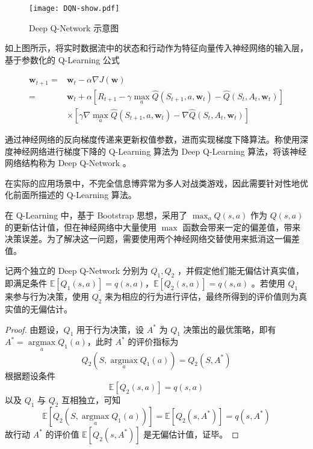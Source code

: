 \begin{figure}[H]
    \centering
    \texttt{[image: DQN-show.pdf]}
    \caption{Deep Q-Network 示意图}
\end{figure}

如上图所示，将实时数据流中的状态和行动作为特征向量传入神经网络的输入层，基于参数化的 Q-Learning 公式

\begin{equation}
\begin{aligned} \boldsymbol{w}_{t+1} =&\boldsymbol{w}_{t}-\alpha\nabla J(\boldsymbol{w}) \\ =&\boldsymbol{w}_{t}+\alpha\left[R_{t+1} - \gamma \max _{a} \widehat{Q}\left(S_{t+1}, a, \boldsymbol{w}_{t}\right)-\widehat{Q}\left(S_{t}, A_{t}, \boldsymbol{w}_{t}\right)\right]\\&\times\left[\gamma\nabla \max _{a} \widehat{Q}\left(S_{t+1}, a, \boldsymbol{w}_{t}\right)-\nabla \widehat{Q}\left(S_{t}, A_{t}, \boldsymbol{w}_{t}\right)\right] \end{aligned}
\end{equation}

通过神经网络的反向梯度传递来更新权值参数，进而实现梯度下降算法\cite{hecht1992theory}。称使用深度神经网络进行梯度下降的 Q-Learning 算法为 Deep Q-Learning 算法，将该神经网络结构称为 Deep Q-Network 。

在实际的应用场景中，不完全信息博弈常为多人对战类游戏，因此需要针对性地优化前面所描述的 Q-Learning 算法。

在 Q-Learning 中，基于 Bootstrap 思想，采用了 $\max_aQ(s,a)$ 作为 $Q(s,a)$ 的更新估计值，但在神经网络中大量使用 $\max$ 函数会带来一定的偏差值，带来决策误差。为了解决这一问题，需要使用两个神经网络交替使用来抵消这一偏差值。

\begin{Theorem}\label{the:doubledqn}
    记两个独立的 Deep Q-Network 分别为 $Q_1,Q_2$ ，并假定他们能无偏估计真实值，即满足条件 $\mathbb{E}\left[Q_1(s,a)\right] = q(s,a)$，$\mathbb{E}\left[Q_2(s,a)\right] = q(s,a)$ 。若使用 $Q_1$ 来参与行为决策，使用 $Q_2$ 来为相应的行为进行评估，最终所得到的评价值则为真实值的无偏估计。
\end{Theorem}

\begin{proof}
    由题设，$Q_1$ 用于行为决策，设 $A^*$ 为 $Q_1$ 决策出的最优策略，即有 $A^*=\mathop{\arg\max}\limits_aQ_1(a)$，此时 $A^*$ 的评价指标为
    \begin{equation}
        Q_2(S,\mathop{\arg\max}\limits_aQ_1(a)) = Q_2(S,A^*)
    \end{equation}
    根据题设条件
    \begin{equation}
        \mathbb{E}\left[Q_2(s,a)\right] = q(s,a)
    \end{equation}
    以及 $Q_1$ 与 $Q_2$ 互相独立，可知
    \begin{equation}
        \mathbb{E}\left[Q_2(S,\mathop{\arg\max}\limits_aQ_1(a))\right]=\mathbb{E}\left[Q_2(s,A^*)\right]=q(s,A^*)
    \end{equation}
    故行动 $A^*$ 的评价值 $\mathbb{E}\left[Q_2(s,A^*)\right]$ 是无偏估计值，证毕。
\end{proof}


